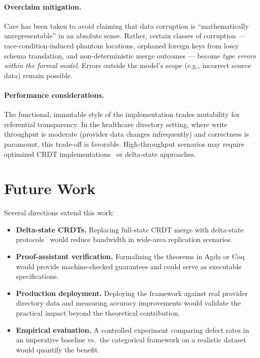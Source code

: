\documentclass[11pt,a4paper]{article}
\begin{document}
\paragraph{Overclaim mitigation.}
Care has been taken to avoid claiming that data corruption is
``mathematically unrepresentable'' in an absolute sense. Rather,
certain classes of corruption --- race-condition-induced phantom
locations, orphaned foreign keys from lossy schema translation, and
non-deterministic merge outcomes --- become \emph{type errors within
the formal model}. Errors outside the model's scope (e.g., incorrect
source data) remain possible.

\paragraph{Performance considerations.}
The functional, immutable style of the implementation trades
mutability for referential transparency. In the healthcare directory
setting, where write throughput is moderate (provider data changes
infrequently) and correctness is paramount, this trade-off is
favorable. High-throughput scenarios may require optimized CRDT
implementations~\citep{baquero2017} or delta-state approaches.

\section{Future Work}
\label{sec:future-work}

Several directions extend this work:
\begin{itemize}
  \item \textbf{Delta-state CRDTs.} Replacing full-state CRDT merge
    with delta-state protocols~\citep{baquero2017} would reduce
    bandwidth in wide-area replication scenarios.
  \item \textbf{Proof-assistant verification.} Formalizing the theorems
    in Agda or Coq would provide machine-checked guarantees and could
    serve as executable specifications.
  \item \textbf{Production deployment.} Deploying the framework against
    real provider directory data and measuring accuracy improvements
    would validate the practical impact beyond the theoretical
    contribution.
  \item \textbf{Empirical evaluation.} A controlled experiment
    comparing defect rates in an imperative baseline vs.\ the
    categorical framework on a realistic dataset would quantify the
    benefit.
\end{itemize}
\end{document}
